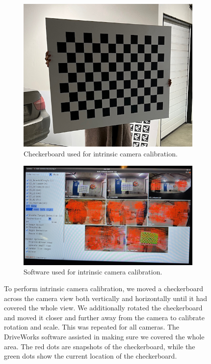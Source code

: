  
\begin{figure}[htbp]
    \centering
    
    \begin{subfigure}[htbp]{0.6\textwidth}
        \centering
        \includegraphics[width=\textwidth]{chapters/3-method/figures/calibration/checkerboard.jpeg}
        \caption{Checkerboard used for intrinsic camera calibration.}
    \end{subfigure}

    \bigskip

    \begin{subfigure}[htbp]{\textwidth}
        \centering
        \includegraphics[width=\textwidth]{chapters/3-method/figures/calibration/intrinsics.jpeg}
        \caption{Software used for intrinsic camera calibration.}
    \end{subfigure}
    
    \caption{To perform intrinsic camera calibration, we moved a checkerboard across the camera view both vertically and horizontally until it had covered the whole view. We additionally rotated the checkerboard and moved it closer and further away from the camera to calibrate rotation and scale. This was repeated for all cameras. The DriveWorks software \cite{driveworks-camera-calibration} assisted in making sure we covered the whole area. The red dots are snapshots of the checkerboard, while the green dots show the current location of the checkerboard.}
    \label{fig:calibration-intrinsics}
\end{figure}


